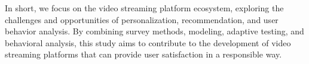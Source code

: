 In short, we focus on the video streaming platform ecosystem, exploring the challenges and opportunities of personalization, recommendation, and user behavior analysis. By combining survey methods, modeling, adaptive testing, and behavioral analysis, this study aims to contribute to the development of video streaming platforms that can provide user satisfaction in a responsible way.









